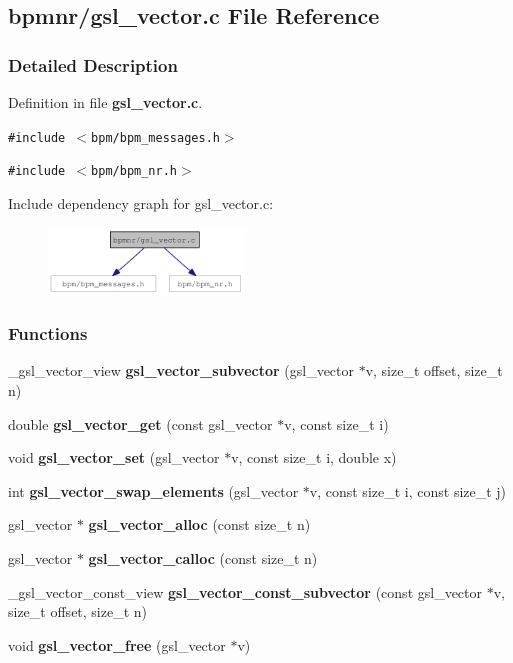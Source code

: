 \subsection{bpmnr/gsl\_\-vector.c File Reference}
\label{gsl__vector_8c}


\subsubsection{Detailed Description}


Definition in file {\bf gsl\_\-vector.c}.

{\tt \#include $<$bpm/bpm\_\-messages.h$>$}\par
{\tt \#include $<$bpm/bpm\_\-nr.h$>$}\par


Include dependency graph for gsl\_\-vector.c:\nopagebreak
\begin{figure}[H]
\begin{center}
\leavevmode
\includegraphics[width=147pt]{gsl__vector_8c__incl}
\end{center}
\end{figure}
\subsubsection*{Functions}
\begin{CompactItemize}
\item 
\_\-gsl\_\-vector\_\-view {\bf gsl\_\-vector\_\-subvector} (gsl\_\-vector $\ast$v, size\_\-t offset, size\_\-t n)
\item 
double {\bf gsl\_\-vector\_\-get} (const gsl\_\-vector $\ast$v, const size\_\-t i)
\item 
void {\bf gsl\_\-vector\_\-set} (gsl\_\-vector $\ast$v, const size\_\-t i, double x)
\item 
int \textbf{gsl\_\-vector\_\-swap\_\-elements} (gsl\_\-vector $\ast$v, const size\_\-t i, const size\_\-t j)\label{group__nr_g2624694e4157398ba344b90eca6ba070}

\item 
gsl\_\-vector $\ast$ \textbf{gsl\_\-vector\_\-alloc} (const size\_\-t n)\label{gsl__vector_8c_af34776639f48fec68e8baab777c6232}

\item 
gsl\_\-vector $\ast$ \textbf{gsl\_\-vector\_\-calloc} (const size\_\-t n)\label{group__nr_gac4c2937f0e28c7a00cfe90b4ad886a6}

\item 
\_\-gsl\_\-vector\_\-const\_\-view \textbf{gsl\_\-vector\_\-const\_\-subvector} (const gsl\_\-vector $\ast$v, size\_\-t offset, size\_\-t n)\label{group__nr_ga45e4b3770af5d15171055314b140838}

\item 
void \textbf{gsl\_\-vector\_\-free} (gsl\_\-vector $\ast$v)\label{group__nr_gedc84887915223f87986de6a67c0249d}

\end{CompactItemize}
